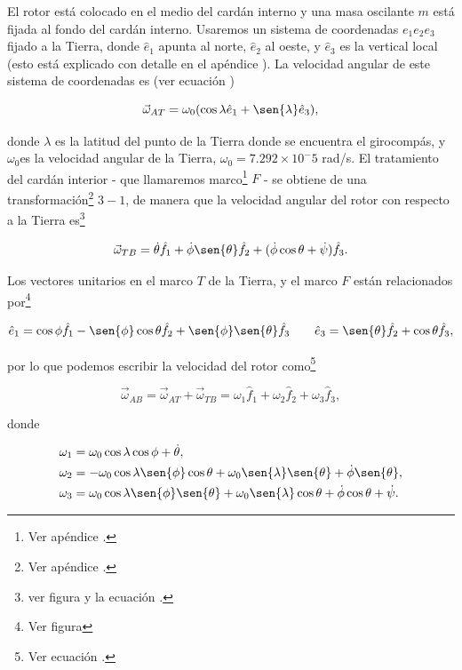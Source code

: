 \documentclass[a4paper,10pt]{article}
\numberwithin{equation}{section}
\begin{document}
El rotor está colocado en el medio del cardán interno y una masa oscilante $m$ está 
fijada al fondo del cardán interno. Usaremos un sistema de coordenadas $e_1e_2e_3$
fijado a la Tierra, donde $\hat{e}_1$ apunta al norte, $\hat{e}_2$ al oeste, y $\hat{e}_3$
es la vertical local (esto está explicado con detalle en el apéndice ). 
La velocidad angular de este sistema de coordenadas es (ver ecuación ) 

\begin{equation}
 \vec{\omega}_{AT} = \omega_0(\cos{\lambda}\hat{e}_1 + \sen{\lambda}\hat{e}_3),
\end{equation}

donde $\lambda$ es la latitud del punto de la Tierra donde se encuentra el girocompás, y 
$\omega_0$es la velocidad angular de la Tierra, $\omega_0 = 7.292\times 10^-5$ rad/s. 
El tratamiento del cardán interior - que llamaremos marco\footnote{Ver apéndice 
.} $F$ - se obtiene de una transformación\footnote{Ver apéndice 
.} $3-1$, de manera que la velocidad angular del rotor con respecto 
a la Tierra es\footnote{ver figura  y la ecuación .}

\begin{equation}
 \vec{\omega}_{TB} = \dot{\theta}\hat{f}_1 + \dot{\phi}\sen{\theta}\hat{f}_2 + 
 (\dot{\phi}\cos{\theta} + \dot{\psi})\hat{f}_3.
\end{equation}

Los vectores unitarios en el marco $T$ de la Tierra, y el marco $F$ están relacionados 
por\footnote{Ver figura }

\begin{equation}
 \hat{e}_1 = \cos{\phi}\hat{f}_1 - \sen{\phi}\cos{\theta}\hat{f}_2 + \sen{\phi}\sen{\theta}\hat{f}_3 
 \qquad \hat{e}_3 = \sen{\theta}\hat{f}_2 + \cos{\theta}\hat{f}_3,
\end{equation}

por lo que podemos escribir la velocidad del rotor como\footnote{Ver ecuación 
.}

\begin{equation}
 \vec{\omega}_{AB} = \vec{\omega}_{AT} + \vec{\omega}_{TB} = \omega_1\hat{f}_1 
 + \omega_2\hat{f}_2 + \omega_3\hat{f}_3,
\end{equation}

donde 

\begin{align}
 \omega_1 &= \omega_0\cos{\lambda}\cos{\phi} + \dot{\theta}, \\
 \omega_2 &= - \omega_0\cos{\lambda}\sen{\phi}\cos{\theta} + \omega_0\sen{\lambda}\sen{\theta} + 
 \dot{\phi}\sen{\theta}, \\
 \omega_3 &= \omega_0\cos{\lambda}\sen{\phi}\sen{\theta} + \omega_0\sen{\lambda}\cos{\theta} 
 + \dot{\phi}\cos{\theta} + \dot{\psi}.
\end{align}
\end{document}
